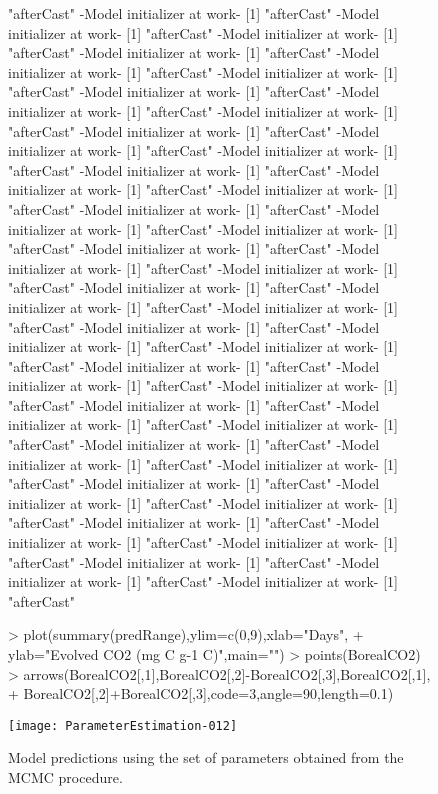 \documentclass[a4paper]{article}
\begin{document}
\begin{figure}
\begin{Schunk}
\begin{Soutput}
[1] "afterCast"
-Model initializer at work-
[1] "afterCast"
-Model initializer at work-
[1] "afterCast"
-Model initializer at work-
[1] "afterCast"
-Model initializer at work-
[1] "afterCast"
-Model initializer at work-
[1] "afterCast"
-Model initializer at work-
[1] "afterCast"
-Model initializer at work-
[1] "afterCast"
-Model initializer at work-
[1] "afterCast"
-Model initializer at work-
[1] "afterCast"
-Model initializer at work-
[1] "afterCast"
-Model initializer at work-
[1] "afterCast"
-Model initializer at work-
[1] "afterCast"
-Model initializer at work-
[1] "afterCast"
-Model initializer at work-
[1] "afterCast"
-Model initializer at work-
[1] "afterCast"
-Model initializer at work-
[1] "afterCast"
-Model initializer at work-
[1] "afterCast"
-Model initializer at work-
[1] "afterCast"
-Model initializer at work-
[1] "afterCast"
-Model initializer at work-
[1] "afterCast"
-Model initializer at work-
[1] "afterCast"
-Model initializer at work-
[1] "afterCast"
-Model initializer at work-
[1] "afterCast"
-Model initializer at work-
[1] "afterCast"
-Model initializer at work-
[1] "afterCast"
-Model initializer at work-
[1] "afterCast"
-Model initializer at work-
[1] "afterCast"
-Model initializer at work-
[1] "afterCast"
-Model initializer at work-
[1] "afterCast"
-Model initializer at work-
[1] "afterCast"
-Model initializer at work-
[1] "afterCast"
-Model initializer at work-
[1] "afterCast"
-Model initializer at work-
[1] "afterCast"
-Model initializer at work-
[1] "afterCast"
-Model initializer at work-
[1] "afterCast"
-Model initializer at work-
[1] "afterCast"
-Model initializer at work-
[1] "afterCast"
-Model initializer at work-
[1] "afterCast"
-Model initializer at work-
[1] "afterCast"
-Model initializer at work-
[1] "afterCast"
-Model initializer at work-
[1] "afterCast"
-Model initializer at work-
[1] "afterCast"
-Model initializer at work-
[1] "afterCast"
-Model initializer at work-
[1] "afterCast"
-Model initializer at work-
[1] "afterCast"
\end{Soutput}
\begin{Sinput}
> plot(summary(predRange),ylim=c(0,9),xlab="Days",
+      ylab="Evolved CO2 (mg C g-1 C)",main="")
> points(BorealCO2)
> arrows(BorealCO2[,1],BorealCO2[,2]-BorealCO2[,3],BorealCO2[,1],
+        BorealCO2[,2]+BorealCO2[,3],code=3,angle=90,length=0.1)
\end{Sinput}
\end{Schunk}
\texttt{[image: ParameterEstimation-012]}
  \caption{Model predictions using the set of parameters obtained from the MCMC procedure.}
  \label{fig:sensRange}
\end{figure}
\end{document}
